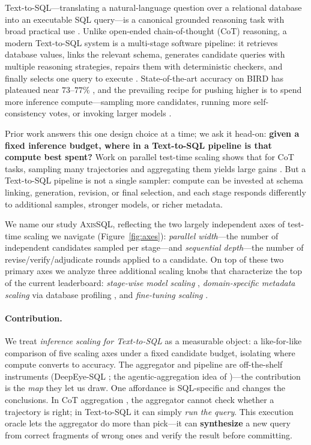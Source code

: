 \documentclass{article}
\newcommand{\sys}{\textsc{AxisSQL}\xspace}
\begin{document}
Text-to-SQL---translating a natural-language question over a relational database into an executable SQL query---is a canonical grounded reasoning task with broad practical use \citep{liu2025survey,li2024bird,yu2018spider}. Unlike open-ended chain-of-thought (CoT) reasoning, a modern Text-to-SQL system is a multi-stage software pipeline: it retrieves database values, links the relevant schema, generates candidate queries with multiple reasoning strategies, repairs them with deterministic checkers, and finally selects one query to execute \citep{li2026deepeye,talaei2024chess,pourreza2025chase}. State-of-the-art accuracy on BIRD has plateaued near $73$--$77\%$ \citep{pourreza2025chase,liu2025xiyan}, and the prevailing recipe for pushing higher is to spend more inference compute---sampling more candidates, running more self-consistency votes, or invoking larger models \citep{pourreza2025chase,liu2025xiyan,li2025alphasql}.

Prior work answers this one design choice at a time; we ask it head-on: \textbf{given a fixed inference budget, where in a Text-to-SQL pipeline is that compute best spent?} Work on parallel test-time scaling shows that for CoT tasks, sampling many trajectories and aggregating them yields large gains \citep{brown2024monkeys,wang2023selfconsistency,snell2025scaling,zhao2025majority}. But a Text-to-SQL pipeline is not a single sampler: compute can be invested at schema linking, generation, revision, or final selection, and each stage responds differently to additional samples, stronger models, or richer metadata.

We name our study \sys, reflecting the two largely independent axes of test-time scaling we navigate (Figure~\ref{fig:axes}): \emph{parallel width}---the number of independent candidates sampled per stage---and \emph{sequential depth}---the number of revise/verify/adjudicate rounds applied to a candidate. On top of these two primary axes we analyze three additional scaling knobs that characterize the top of the current leaderboard: \emph{stage-wise model scaling} \citep{pourreza2025chase,liu2025xiyan}, \emph{domain-specific metadata scaling} via database profiling \citep{shkapenyuk2025metadata}, and \emph{fine-tuning scaling} \citep{li2025omnisql,li2024codes}.

\paragraph{Contribution.} We treat \emph{inference scaling for Text-to-SQL} as a measurable object: a like-for-like comparison of five scaling axes under a fixed candidate budget, isolating where compute converts to accuracy. The aggregator and pipeline are off-the-shelf instruments (DeepEye-SQL \citep{li2026deepeye}; the agentic-aggregation idea of \citealp{lee2026aggagent})---the contribution is the \emph{map} they let us draw. One affordance is SQL-specific and changes the conclusions. In CoT aggregation \citep{lee2026aggagent}, the aggregator cannot check whether a trajectory is right; in Text-to-SQL it can simply \emph{run the query}. This execution oracle lets the aggregator do more than pick---it can \textbf{synthesize} a new query from correct fragments of wrong ones and verify the result before committing.
\end{document}
